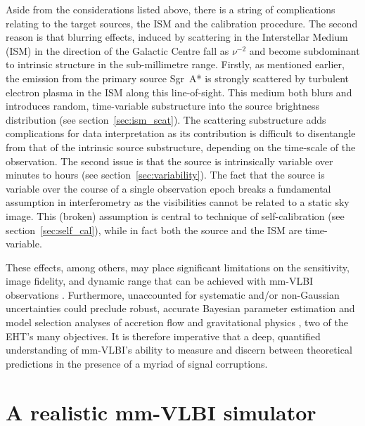 {%
Aside from the considerations listed above, there is a string of complications relating to the target sources, the ISM and the calibration procedure. 
The second reason is that blurring effects, induced by scattering in the Interstellar Medium (ISM) in the direction of the Galactic Centre \citep[e.g.][]{Fish_2014} fall as $\nu^{-2}$ and become subdominant to intrinsic structure in the sub-millimetre range.
Firstly, as mentioned earlier, the emission from the primary source Sgr~A* is strongly scattered by turbulent electron plasma in the ISM along this line-of-sight. This medium both blurs and introduces random, time-variable substructure into the source brightness distribution (see section~\ref{sec:ism_scat}). The scattering substructure adds complications for data interpretation as its contribution is difficult to disentangle from that of the intrinsic source substructure, depending on the time-scale of the observation.
The second issue is that the source is intrinsically variable over minutes to hours (see section~\ref{sec:variability}). The fact that the source is variable over the course of a single observation epoch breaks a fundamental assumption in interferometry as the visibilities cannot be related to a static sky image.
This (broken) assumption is central to technique of self-calibration (see section~\ref{sec:self_cal}), while in fact both the source and the ISM are time-variable.


These effects, among others, may place significant limitations on the sensitivity, image fidelity, and dynamic range that can be achieved with mm-VLBI observations \citep{Blecher_2016}.  Furthermore, unaccounted for systematic and/or non-Gaussian uncertainties could preclude robust, accurate Bayesian parameter estimation and model selection analyses of accretion flow \citep[e.g.][]{Broderick_2016} and gravitational physics \citep[e.g.][]{Broderick_2014, Psaltis_2016}, two of the EHT's many objectives. It is therefore imperative that a deep, quantified understanding of mm-VLBI's ability to measure and discern between theoretical predictions in the presence of a myriad of signal corruptions.


\section{A realistic mm-VLBI simulator}

}
